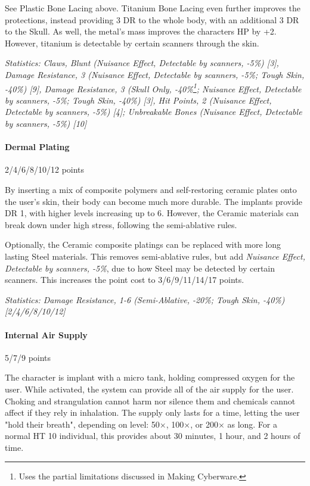 \begin{multicols*}{3}
	See Plastic Bone Lacing above. Titanium Bone Lacing even further improves the protections, instead providing 3 DR to the whole body, with an additional 3 DR to the Skull. As well, the metal's mass improves the characters HP by +2. However, titanium is detectable by certain scanners through the skin.
	
	\textit{\textcolor{OliveGreen}{Statistics: Claws, Blunt (Nuisance Effect, Detectable by scanners,  -5\%) [3], Damage Resistance, 3 (Nuisance Effect, Detectable by scanners, -5\%; Tough Skin, -40\%) [9], Damage Resistance, 3 (Skull Only, -40\%\footnote {Uses the partial limitations discussed in Making Cyberware.}; Nuisance Effect, Detectable by scanners, -5\%; Tough Skin, -40\%) [3], Hit Points, 2 (Nuisance Effect, Detectable by scanners,  -5\%) [4]; Unbreakable Bones (Nuisance Effect, Detectable by scanners,  -5\%) [10]}}
	
	\paragraph{Dermal Plating}
	\begin{flushright}
		2/4/6/8/10/12 points
	\end{flushright}
	
	By inserting a mix of composite polymers and self-restoring ceramic plates onto the user's skin, their body can become much more durable. The implants provide DR 1, with higher levels increasing up to 6. However, the Ceramic materials can break down under high stress, following the semi-ablative rules.
	
	Optionally, the Ceramic composite platings can be replaced with more long lasting Steel materials. This removes semi-ablative rules, but add \textit{Nuisance Effect, Detectable by scanners, -5\%}, due to how Steel may be detected by certain scanners. This increases the point cost to 3/6/9/11/14/17 points.
	
	\textit{\textcolor{OliveGreen}{Statistics: Damage Resistance, 1-6 (Semi-Ablative, -20\%; Tough Skin, -40\%) [2/4/6/8/10/12]}}
	
	\paragraph{Internal Air Supply}
	\begin{flushright}
		5/7/9 points
	\end{flushright}
	
	The character is implant with a micro tank, holding compressed oxygen for the user. While activated, the system can provide all of the air supply for the user. Choking and strangulation cannot harm nor silence them and chemicals cannot affect if they rely in inhalation. The supply only lasts for a time, letting the user "hold their breath", depending on level: 50×, 100×, or 200× as long. For a normal HT 10 individual, this provides about 30 minutes, 1 hour, and 2 hours of time.
	

\end{multicols*}
